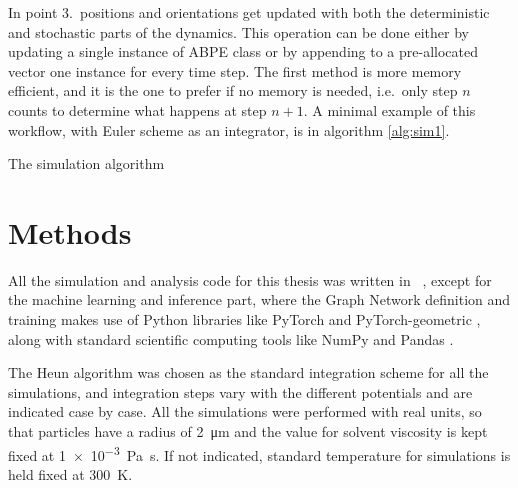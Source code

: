 \documentclass[../../master_thesis_np.tex]{subfiles}
\begin{document}
	In point 3.\ positions and orientations get updated with both the deterministic and stochastic parts of the dynamics. 
	This operation can be done either by updating a single instance of ABPE class or by appending to a pre-allocated vector one instance for every time step. 
	The first method is more memory efficient, and it is the one to prefer if no memory is needed, i.e.\ only step $n$ counts to determine what happens at step $n+1$. 
	A minimal example of this workflow, with Euler scheme as an integrator, is in algorithm \ref{alg:sim1}.
	
	\begin{algorithm}
		\caption{The simulation algorithm} \label{alg:sim1}	
		\begin{algorithmic}[1]
			\EndFor
			\EndFor
			\EndFor
		\end{algorithmic}
	\end{algorithm}  
	
	\section{Methods}
	All the simulation and analysis code for this thesis was written in \julia\ \cite{julia}, except for the machine learning and inference part, where the Graph Network definition and training makes use of Python libraries like PyTorch \cite{pytorch} and PyTorch-geometric \cite{pyg}, along with standard scientific computing tools like NumPy \cite{numpy} and Pandas \cite{pandas}.
	
	{\color{brown}The Heun algorithm} was chosen as the standard integration scheme for all the simulations, and integration steps vary with the different potentials and are indicated case by case. 
	All the simulations were performed with real units, so that particles have a radius of \SI{2}{\um} and the value for solvent viscosity is kept fixed at \SI{1e-3}{\pascal\second}. 
	If not indicated, standard temperature for simulations is held fixed at \SI{300}{\kelvin}.
	
\end{document}
